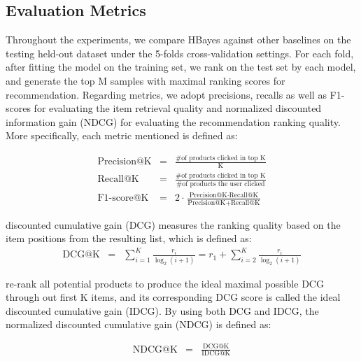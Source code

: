{\subsection{Evaluation Metrics}
Throughout the experiments, we compare HBayes against other baselines on the testing held-out dataset under the 5-folds cross-validation settings.  For each fold, after fitting the model on the training set, we rank on the test set by each model, and generate the top M samples with maximal ranking scores for recommendation.  Regarding metrics, we adopt precisions, recalls as well as F1-scores for evaluating the item retrieval quality and normalized discounted information gain (NDCG) for evaluating the recommendation ranking quality.  More specifically, each metric mentioned is defined as:

\begin{eqnarray}
\text{Precision@K} & = & \frac{\text{\# of products clicked in top K}}{\text{K}} \nonumber \\
\text{Recall@K}      & = & \frac{\text{\# of products clicked in top K}}{\text{\# of products the user clicked}} \nonumber \\
\text{F1-score@K} & = & 2\cdot\frac{\text{Precision@K} \cdot \text{Recall@K}}{\text{Precision@K} + \text{Recall@K}}  \nonumber
\end{eqnarray}

discounted cumulative gain (DCG) measures the ranking quality based on the item positions from the resulting list, which is defined as:
\begin{eqnarray}
\text{DCG@K} & = & \sum_{i=1}^K\frac{r_i}{\log_2(i+1)} =  r_1 + \sum_{i=2}^K\frac{r_i}{\log_2(i+1)}\nonumber
\end{eqnarray}

re-rank all potential products to produce the ideal maximal possible DCG through out first K items, and its corresponding DCG score is called the ideal discounted cumulative gain (IDCG).  By using both DCG and IDCG, the normalized discounted cumulative gain (NDCG) is defined as:

\begin{eqnarray}
\text{NDCG@K} & = & \frac{\text{DCG@K}}{\text{IDCG@K}}\nonumber
\end{eqnarray}

}
